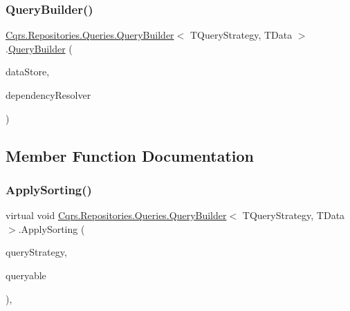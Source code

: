 \subsubsection{\texorpdfstring{Query\+Builder()}{QueryBuilder()}}
{\footnotesize\ttfamily \hyperlink{classCqrs_1_1Repositories_1_1Queries_1_1QueryBuilder}{Cqrs.\+Repositories.\+Queries.\+Query\+Builder}$<$ T\+Query\+Strategy, T\+Data $>$.\hyperlink{classCqrs_1_1Repositories_1_1Queries_1_1QueryBuilder}{Query\+Builder} (\begin{DoxyParamCaption}\item[{\hyperlink{interfaceCqrs_1_1DataStores_1_1IDataStore}{I\+Data\+Store}$<$ T\+Data $>$}]{data\+Store,  }\item[{\hyperlink{interfaceCqrs_1_1Configuration_1_1IDependencyResolver}{I\+Dependency\+Resolver}}]{dependency\+Resolver }\end{DoxyParamCaption})\hspace{0.3cm}{\ttfamily [protected]}}



\subsection{Member Function Documentation}
\mbox{\label{classCqrs_1_1Repositories_1_1Queries_1_1QueryBuilder_aea4b78b2633babfaea0862f2a365c7d3_aea4b78b2633babfaea0862f2a365c7d3}} 
\subsubsection{\texorpdfstring{Apply\+Sorting()}{ApplySorting()}}
{\footnotesize\ttfamily virtual void \hyperlink{classCqrs_1_1Repositories_1_1Queries_1_1QueryBuilder}{Cqrs.\+Repositories.\+Queries.\+Query\+Builder}$<$ T\+Query\+Strategy, T\+Data $>$.Apply\+Sorting (\begin{DoxyParamCaption}\item[{T\+Query\+Strategy}]{query\+Strategy,  }\item[{ref I\+Queryable$<$ T\+Data $>$}]{queryable }\end{DoxyParamCaption})\hspace{0.3cm}{\ttfamily [protected]}, {\ttfamily [virtual]}}

